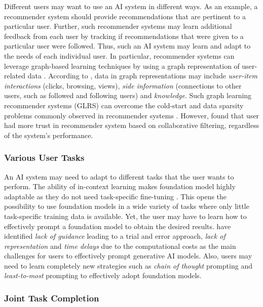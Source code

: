 Different users may want to use an AI system in different ways. As an example, a recommender system should
provide recommendations that are pertinent to a particular user. Further, such recommender systems may learn
additional feedback from each user by tracking if recommendations that were given to a particular user were
followed. Thus, such an AI system may learn and adapt to the needs of each individual user. 
In particular, recommender systems can leverage graph-based learning techniques by using a graph representation
of user-related data \citep{zhangRecommendingGraphsComprehensive2023}. According to \cite{dengRecommenderSystemsBased2022},
data in graph representations may include \textit{user-item interactions} (clicks, browsing, views), \textit{side information}
(connections to other users, such as followed and following users) and \textit{knowledge}. Such graph learning recommender
systems (GLRS) can overcome the cold-start and data sparsity problems commonly observed in recommender systems
\citep{zhangRecommendingGraphsComprehensive2023}. However, \cite{liaoUserTrustRecommendation2022} found that user had
more trust in recommender system based on collaborative filtering, regardless of the system's performance.

\subsubsection{Various User Tasks}

An AI system may need to adapt to different tasks that the user wants to perform. The ability of in-context learning makes
foundation model highly adaptable as they do not need task-specific fine-tuning \citep{brownLanguageModelsAre2020}. This opens
the possibility to use foundation models in a wide variety of tasks where only little task-specific training data is available.
Yet, the user may have to learn how to effectively prompt a foundation model to obtain the desired results. \cite{dangHowPromptOpportunities2022}
have identified \textit{lack of guidance} leading to a trial and error approach, \textit{lack of representation} and \textit{time delays}
due to the computational costs as the main challenges for users to effectively prompt generative AI models. Also, users may need to
learn completely new strategies such as \textit{chain of thought} prompting \citep{weiChainofThoughtPromptingElicits2023} and 
\textit{least-to-most} prompting \citep{zhouLeasttoMostPromptingEnables2023} to effectively adopt foundation models.

\subsubsection{Joint Task Completion}

